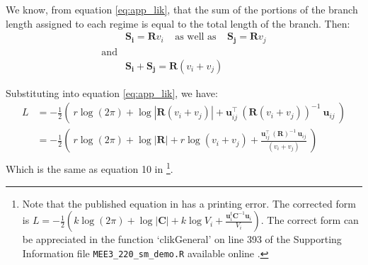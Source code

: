 \begin{enumerate}
\pagebreak

We know, from equation \ref{eq:app_lik}, that the sum of the portions of the branch length assigned to each regime is equal to the total length of the branch. Then:
\begin{equation*}
\begin{split}
& \mathbf{S_{i}} = \mathbf{R} v_{i} \: \: \: \: \: \text{as well as} \: \: \: \: \: \mathbf{S_{j}} = \mathbf{R} v_{j} \\
\text{and} &\\
& \mathbf{S_{i}} + \mathbf{S_{j}} = \mathbf{R} ( v_{i} + v_{j} )
\end{split}
\end{equation*}

Substituting into equation \ref{eq:app_lik}, we have:
\begin{equation} \label{eq:app_lik_proof}
\begin{split}
L &= - \frac{1}{2} \left( \: r \log(2 \pi) + \log | \mathbf{R} ( v_{i} + v_{j} )  | + \mathbf{u}_{ij}^\intercal \: (\mathbf{R} ( v_{i} + v_{j} ))^{-1} \:  \mathbf{u}_{ij} \: \right)  \\
&= - \frac{1}{2} \left( \: r \log(2 \pi) + \log | \mathbf{R} | + r \log( v_{i} + v_{j} ) + \frac{\mathbf{u}_{ij}^\intercal \: (\mathbf{R})^{-1} \:  \mathbf{u}_{ij}}{( v_{i} + v_{j} )} \: \right)  \\
\end{split}
\end{equation}
Which is the same as equation 10 in \citet{freckleton_fast_2012}\footnote{Note that the published equation in \citet{freckleton_fast_2012} has a printing error. The corrected form is \linebreak $ L = - \frac{1}{2} \left( k \log(2\pi) + \log | \mathbf{C} | + k \log \mathit{V}_{i} + \frac{\mathbf{u}_{i}^{t} \mathbf{C}^{-1} \mathbf{u}_{i}}{\mathit{V}_{i}} \right) $. The correct form can be appreciated in the function `clikGeneral' on line 393 of the Supporting Information file \texttt{MEE3\_220\_sm\_demo.R} available online \citep{freckleton_fast_2012}.}.


\end{enumerate}

